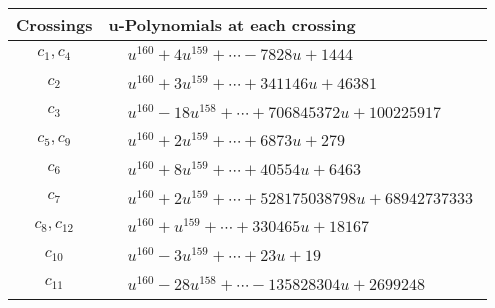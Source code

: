 \documentclass[1p]{elsarticle_modified}
\theoremstyle{definition}
\begin{document}
\begin{tabular}{m{50pt}|m{274pt}}
Crossings & \hspace{64pt}u-Polynomials at each crossing \\
\hline $$\begin{aligned}c_{1},c_{4}\end{aligned}$$&$\begin{aligned}
&u^{160}+4 u^{159}+\cdots-7828 u+1444
\end{aligned}$\\
\hline $$\begin{aligned}c_{2}\end{aligned}$$&$\begin{aligned}
&u^{160}+3 u^{159}+\cdots+341146 u+46381
\end{aligned}$\\
\hline $$\begin{aligned}c_{3}\end{aligned}$$&$\begin{aligned}
&u^{160}-18 u^{158}+\cdots+706845372 u+100225917
\end{aligned}$\\
\hline $$\begin{aligned}c_{5},c_{9}\end{aligned}$$&$\begin{aligned}
&u^{160}+2 u^{159}+\cdots+6873 u+279
\end{aligned}$\\
\hline $$\begin{aligned}c_{6}\end{aligned}$$&$\begin{aligned}
&u^{160}+8 u^{159}+\cdots+40554 u+6463
\end{aligned}$\\
\hline $$\begin{aligned}c_{7}\end{aligned}$$&$\begin{aligned}
&u^{160}+2 u^{159}+\cdots+528175038798 u+68942737333
\end{aligned}$\\
\hline $$\begin{aligned}c_{8},c_{12}\end{aligned}$$&$\begin{aligned}
&u^{160}+u^{159}+\cdots+330465 u+18167
\end{aligned}$\\
\hline $$\begin{aligned}c_{10}\end{aligned}$$&$\begin{aligned}
&u^{160}-3 u^{159}+\cdots+23 u+19
\end{aligned}$\\
\hline $$\begin{aligned}c_{11}\end{aligned}$$&$\begin{aligned}
&u^{160}-28 u^{158}+\cdots-135828304 u+2699248
\end{aligned}$\\
\hline
\end{tabular}\\~\\
\end{document}
